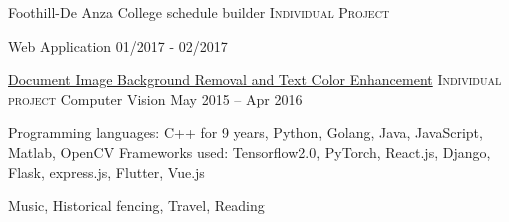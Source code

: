 \documentclass[10pt,a4paper]{article}
\begin{document}
\headedsection
  {Foothill-De Anza College schedule builder}
  {\textsc{Individual Project}} {%

  \headedsubsection
    {Web Application}
    {01/2017 - 02/2017}
    {}
  }

  \headedsection
  {\href{https://github.com/itzMeerkat/PrintableNote}{Document Image Background Removal and Text Color Enhancement}}
  {\textsc{Individual project}} {
    \headedsubsection
    {Computer Vision}
    {May 2015 -- Apr 2016}
    {}
  }

\spacedhrule{0.2em}{-0.4em}



\inlineheadsection
  {Programming languages:}
  {C++ for 9 years, Python, Golang, Java, JavaScript, Matlab, OpenCV}
\inlineheadsection
  {Frameworks used:}
  {Tensorflow2.0, PyTorch, React.js, Django, Flask, express.js, Flutter, Vue.js}
\spacedhrule{1.6em}{-0.4em}


\inlineheadsection
  {}
  {Music, Historical fencing, Travel, Reading}
\end{document}
